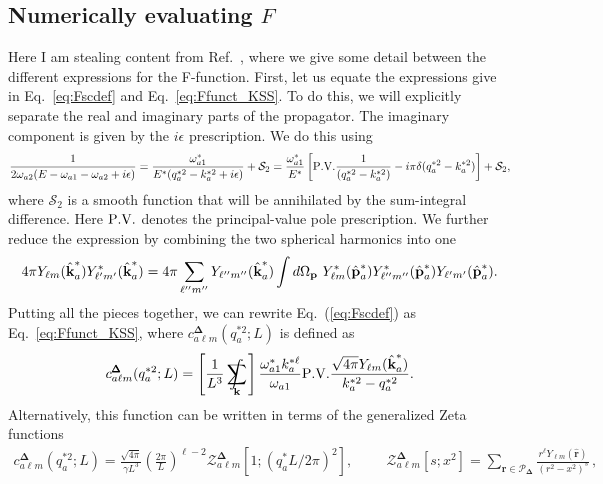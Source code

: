 \subsection{Numerically evaluating $F$}
 
 \label{app:Fnum}
 
 Here I am stealing content from Ref.~\cite{Briceno:2015tza}, where we give some detail between the different expressions for the F-function. First, let us equate the expressions give in Eq.~\ref{eq:Fscdef} and Eq.~\ref{eq:Ffunct_KSS}. To do this, we will explicitly separate the real and imaginary parts of the propagator. The imaginary component is given by the $i \epsilon$ prescription.  We do this using 
\begin{align}
\label{eq:PVdef}
\frac{1}{2 \omega_{a2}(E -  \omega_{a1} - \omega_{a2} + i \epsilon )}
= \frac{\omega_{a1}^*}{E^* (q_a^{*2}-k_a^{*2}+i\epsilon)} + \mathcal S_2
=\frac{\omega_{a1}^*}{E^*}\left[{\rm{P.V.}}\frac{1}{(q_a^{*2}-k_a^{*2})}-i\pi\delta(q_a^{*2}-k_a^{*2})\right] + \mathcal S_2,
\end{align}
where $\mathcal S_2$ is a smooth function that will be annihilated by the sum-integral difference. Here ${\rm{P.V.}}$ denotes the principal-value pole prescription. We further reduce the expression by combining the two spherical harmonics into one
\begin{equation}
4 \pi  Y_{\ell m}(\hat {\textbf k}^*_a)Y^*_{\ell' m'}(\hat {\textbf k}^*_a) =
{4 \pi}\sum_{\ell''m''}
  Y_{\ell'' m''}(\hat {\textbf k}^*_a)
\int d\Omega_{\textbf p}~Y^*_{ \ell m}(\hat {\textbf p}^*_a) Y^*_{\ell'' m''}(\hat {\textbf p}^*_a) Y_{\ell' m'}(\hat {\textbf p}^*_a).
\end{equation}
Putting all the pieces together, we can rewrite Eq.~(\ref{eq:Fscdef}) as Eq.~\ref{eq:Ffunct_KSS}, where $c_{a \ell m}^{{\pmb \Delta}}(q_a^{*2};{L})$ is defined as
\begin{equation}
c_{a \ell m}^{{\pmb \Delta}}(q^{*2}_a;{L})
=
\left[\frac{1}{L^3}\sum_{\mathbf{k}}\hspace{-.5cm}\int~\right]
\frac{\omega_{a1}^*k_a^{*\ell}}{\omega_{a1}}
{\rm{P.V.}}\frac{ \sqrt{4 \pi}  Y_{\ell m}(\hat {\textbf k}^*_a)  }{  k_a^{*2}-q_a^{*2}}.
\end{equation}
Alternatively, this function can be written in terms of the generalized Zeta functions~\cite{Kim:2005gf}
\begin{eqnarray}
\label{eq:clm}
c^{\pmb \Delta}_{a\ell m}(q_a^{*2}; {L})
=\frac{\sqrt{4\pi}}{\gamma L^3}\left(\frac{2\pi}{L}\right)^{\ell-2}\mathcal{Z}^{\pmb \Delta}_{a\ell m}[1;(q_a^* {L}/2\pi)^2],
\hspace{1cm}
\mathcal{Z}^{\pmb \Delta}_{a \ell m}[s;x^2]
= \sum_{\mathbf r \in {\mathcal P}_{{\pmb \Delta}}}\frac{{r}^\ell Y_{\ell m}(\hat {\mathbf{r}})}{(r^2-x^2)^s} \label{eq:clm} \,,
\end{eqnarray} 
